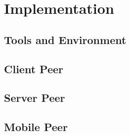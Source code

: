 \chapter{Implementation}


\section{Tools and Environment}

\section{Client Peer}

\section{Server Peer}

\section{Mobile Peer}
